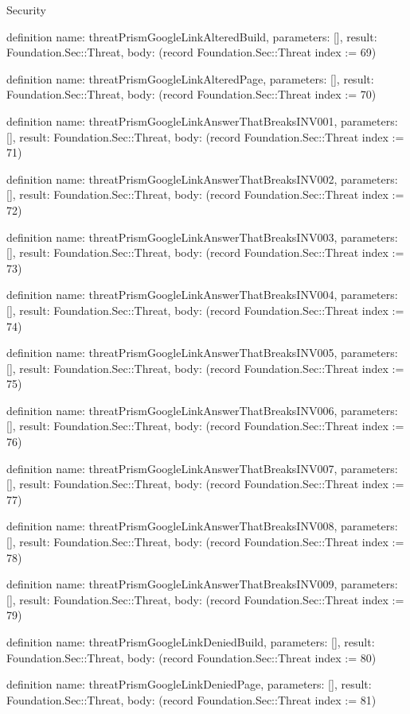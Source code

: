 \begin{lexlean}{Security}
\begin{semanticmodule}
definition{
  name: threatPrismGoogleLinkAlteredBuild,
  parameters: [],
  result: Foundation.Sec::Threat,
  body: (record Foundation.Sec::Threat {index := 69})
}

definition{
  name: threatPrismGoogleLinkAlteredPage,
  parameters: [],
  result: Foundation.Sec::Threat,
  body: (record Foundation.Sec::Threat {index := 70})
}

definition{
  name: threatPrismGoogleLinkAnswerThatBreaksINV001,
  parameters: [],
  result: Foundation.Sec::Threat,
  body: (record Foundation.Sec::Threat {index := 71})
}

definition{
  name: threatPrismGoogleLinkAnswerThatBreaksINV002,
  parameters: [],
  result: Foundation.Sec::Threat,
  body: (record Foundation.Sec::Threat {index := 72})
}

definition{
  name: threatPrismGoogleLinkAnswerThatBreaksINV003,
  parameters: [],
  result: Foundation.Sec::Threat,
  body: (record Foundation.Sec::Threat {index := 73})
}

definition{
  name: threatPrismGoogleLinkAnswerThatBreaksINV004,
  parameters: [],
  result: Foundation.Sec::Threat,
  body: (record Foundation.Sec::Threat {index := 74})
}

definition{
  name: threatPrismGoogleLinkAnswerThatBreaksINV005,
  parameters: [],
  result: Foundation.Sec::Threat,
  body: (record Foundation.Sec::Threat {index := 75})
}

definition{
  name: threatPrismGoogleLinkAnswerThatBreaksINV006,
  parameters: [],
  result: Foundation.Sec::Threat,
  body: (record Foundation.Sec::Threat {index := 76})
}

definition{
  name: threatPrismGoogleLinkAnswerThatBreaksINV007,
  parameters: [],
  result: Foundation.Sec::Threat,
  body: (record Foundation.Sec::Threat {index := 77})
}

definition{
  name: threatPrismGoogleLinkAnswerThatBreaksINV008,
  parameters: [],
  result: Foundation.Sec::Threat,
  body: (record Foundation.Sec::Threat {index := 78})
}

definition{
  name: threatPrismGoogleLinkAnswerThatBreaksINV009,
  parameters: [],
  result: Foundation.Sec::Threat,
  body: (record Foundation.Sec::Threat {index := 79})
}

definition{
  name: threatPrismGoogleLinkDeniedBuild,
  parameters: [],
  result: Foundation.Sec::Threat,
  body: (record Foundation.Sec::Threat {index := 80})
}

definition{
  name: threatPrismGoogleLinkDeniedPage,
  parameters: [],
  result: Foundation.Sec::Threat,
  body: (record Foundation.Sec::Threat {index := 81})
}


\end{semanticmodule}
\end{lexlean}
